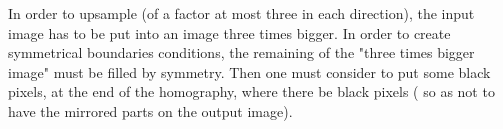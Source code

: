  In order to upsample (of a factor at most three in each direction), the input image has to be put into an image three times bigger. In order to create symmetrical boundaries conditions, the remaining of the "three times bigger image"  must be filled by symmetry. Then one must consider to put some black pixels, at the end of the homography, where there be black pixels ( so as not to have the mirrored parts on the output image).

  
  
